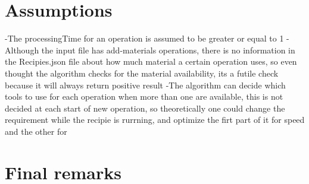 \documentclass[12pt]{article}
\begin{document}
\section{Assumptions}

-The processingTime for an operation is assumed to be greater or equal to 1
-Although the input file has add-materials operations, there is no information in the Recipies.json file about how much material a certain operation uses, so even thought the algorithm checks for
the material availability, its a futile check because it will always return positive result
-The algorithm can decide which tools to use for each operation when more than one are available, this is not decided at each start of new operation, so theoretically one could change the requirement while the recipie is rurrning, and optimize the firt part of it for speed and the other for

\section{Final remarks}
\end{document}
